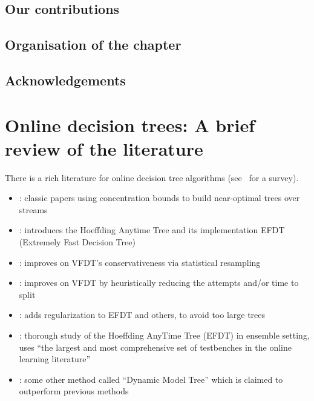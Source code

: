\subsection{Our contributions}
\subsection{Organisation of the chapter}
\subsection{Acknowledgements}

\section{Online decision trees: A brief review of the literature}
 There is a rich literature for online decision tree algorithms (see~\cite{Manapragada2022_AnEagerSplitting} for a survey).
\begin{itemize}
    \item \cite{Domingos2000_HighSpeedStreams,Domingos2001_MiningTimeSeries,Gama2003_HighSpeedStreams,Jin2003_EfficientDecisionTree,Rutkowski2013_DecisionTreesForMining}: classic papers using concentration bounds to build near-optimal trees over streams
    \item \cite{Manapragada2018_EFDT}: introduces the Hoeffding Anytime Tree and its implementation EFDT (Extremely Fast Decision Tree)
    \item \cite{Das2019_LearnSmartWithLess}: improves on VFDT's conservativeness via statistical resampling
   \item \cite{sun2020_SpeedingUpVeryFast}: improves on VFDT by heuristically reducing the attempts and/or time to split 
   \item \cite{Barddal2020_RegularizedAndIncremental}: adds regularization to EFDT and others, to avoid too large trees
   \item \cite{Manapragada2022_AnEagerSplitting}: thorough study of the Hoeffding AnyTime Tree (EFDT) in ensemble setting, uses ``the largest and most comprehensive set of testbenches in the online learning literature''
   \item \cite{Haug2022_DynamicModelTree}: some other method called ``Dynamic Model Tree'' which is claimed to outperform previous methods
\end{itemize}

